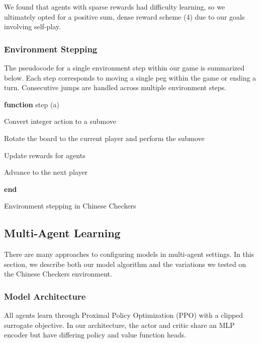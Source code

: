 \documentclass[12pt, a4paper, twocolumn]{article}
\begin{document}
We found that agents with sparse rewards had difficulty learning, so we ultimately opted for a positive sum, dense reward scheme (4) due to our goals involving self-play.

\subsubsection{Environment Stepping}

The pseudocode for a single environment step within our game is summarized below. Each step corresponds to moving a single peg within the game or ending a turn. Consecutive jumps are handled across multiple environment steps.

\begin{algorithm}

  \textbf{function} step (a)
  
  \Indp

  \Input{\textit{a}: Integer action in $[0, (4N + 1) \times (4N + 1) \times 6 \times 2 + 1)$}
  
  Convert integer action to a submove

  Rotate the board to the current player and perform the submove

  Update rewards for agents

    {
      Advance to the next player
    }

  \Indm

  \textbf{end}

  \caption{Environment stepping in Chinese Checkers}
\end{algorithm}
  
\subsection{Multi-Agent Learning}

There are many approaches to configuring models in multi-agent settings. In this section, we describe both our model algorithm and the variations we tested on the Chinese Checkers environment.

\subsubsection{Model Architecture}

All agents learn through Proximal Policy Optimization (PPO) with a clipped surrogate objective\cite{PPO}. In our architecture, the actor and critic share an MLP encoder but have differing policy and value function heads.
\end{document}
